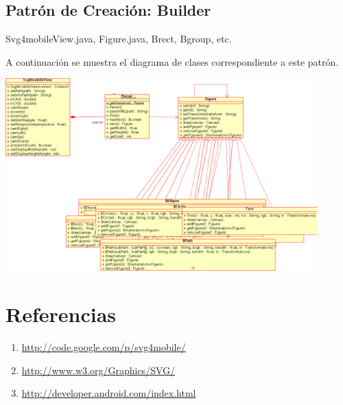 \documentclass[a4paper,10pt]{article}
\begin{document}
\subsection{Patrón de Creación: Builder}
Svg4mobileView.java, Figure.java, Brect, Bgroup, etc.

A continuación se muestra el diagrama de clases correspondiente a este patrón.

\begin{center}
 \includegraphics[width=12cm]{builder.png}
\end{center}

\section{Referencias}

\begin{enumerate}
\item \url{http://code.google.com/p/svg4mobile/}
\item \url{http://www.w3.org/Graphics/SVG/}
\item \url{http://developer.android.com/index.html}
\end{enumerate}
\end{document}
